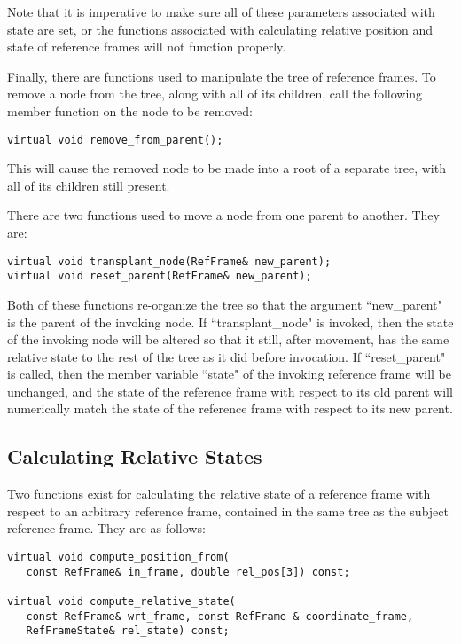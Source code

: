 Note that it is imperative to make sure all of these parameters associated with
state are set, or the functions associated with calculating relative position and
state of reference frames will not function properly.

Finally, there are functions used to manipulate the tree of reference frames.
To remove a node from the tree, along with all of its children, call
the following member function on the node to be removed:

\begin{verbatim}
virtual void remove_from_parent();
\end{verbatim}

This will cause the removed node to be made into a root of a separate tree, with
all of its children still present.

There are two functions used to move a node from one parent to another. They are:

\begin{verbatim}
virtual void transplant_node(RefFrame& new_parent);
virtual void reset_parent(RefFrame& new_parent);
\end{verbatim}

Both of these functions re-organize the tree so that the argument
``new\_parent" is the parent of the invoking node. If ``transplant\_node"
is invoked, then the state of the invoking node will be altered so that it
still, after movement, has the same relative state to the rest of the tree
as it did before invocation. If ``reset\_parent" is called, then the
member variable ``state" of the invoking reference frame will be unchanged,
and the state of the reference frame with respect to its old parent will
numerically match the state of the reference frame with respect to its
new parent.

\subsection{Calculating Relative States}

Two functions exist for calculating the relative state of a reference frame
with respect to an arbitrary reference frame, contained in
the same tree as the subject reference frame. They are as follows:

\begin{verbatim}
virtual void compute_position_from(
   const RefFrame& in_frame, double rel_pos[3]) const;

virtual void compute_relative_state(
   const RefFrame& wrt_frame, const RefFrame & coordinate_frame,
   RefFrameState& rel_state) const;

\end{verbatim}

